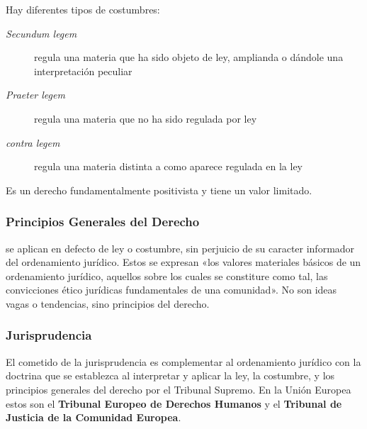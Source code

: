         Hay diferentes tipos de costumbres:
        \begin{description}
            \item[\textit{Secundum legem}] regula una materia que ha sido objeto de ley, amplianda o dándole una interpretación peculiar
            \item[\textit{Praeter legem}] regula una materia que no ha sido regulada por ley
            \item[\textit{contra legem}] regula una materia distinta a como aparece regulada en la ley
        \end{description}

        Es un derecho fundamentalmente positivista y tiene un valor limitado.

    \subsubsection{Principios Generales del Derecho}
        se aplican en defecto de ley o costumbre, sin perjuicio de su caracter informador del ordenamiento jurídico. Estos se expresan «los valores materiales básicos de un ordenamiento jurídico, aquellos sobre los cuales se constiture como tal, las convicciones ético jurídicas fundamentales de una comunidad». No son ideas vagas o tendencias, sino principios del derecho.

    \subsubsection{Jurisprudencia}
        El cometido de la jurisprudencia es complementar al ordenamiento jurídico con la doctrina que se establezca al interpretar y aplicar la ley, la costumbre, y los principios generales del derecho por el Tribunal Supremo. En la Unión Europea estos son el \textbf{Tribunal Europeo de Derechos Humanos} y el \textbf{Tribunal de Justicia de la Comunidad Europea}.
